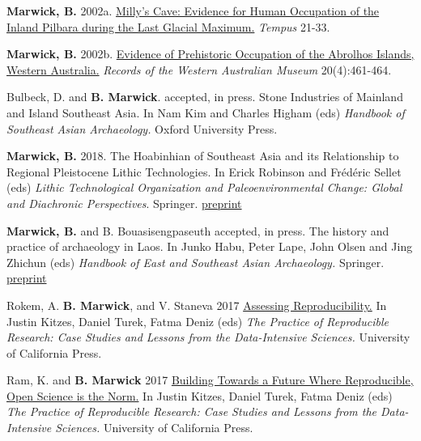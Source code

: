 \documentclass[11pt,article,oneside]{memoir}
\begin{document}
{{{{\ind \textbf{Marwick, B.} 2002a. \href{http://faculty.washington.edu/bmarwick/PDFs/Marwick_2002_Tempus.pdf}{Milly's Cave: Evidence for Human Occupation of the Inland Pilbara during the Last Glacial Maximum.} \textit{Tempus} 21-33.

\ind \textbf{Marwick, B.} 2002b. \href{http://faculty.washington.edu/bmarwick/PDFs/Marwick_2002_RWAM.pdf}{Evidence of Prehistoric Occupation of the Abrolhos Islands, Western Australia.} \textit{Records of the Western Australian Museum} 20(4):461-464.

\bigskip


\ind Bulbeck, D. and \textbf{B. Marwick}. accepted, in press. Stone Industries of Mainland and Island Southeast Asia. In Nam Kim and Charles Higham (eds) \textit{Handbook of Southeast Asian Archaeology.} Oxford University Press.

\ind \textbf{Marwick, B.} 2018. The Hoabinhian of Southeast Asia and its Relationship to Regional Pleistocene Lithic Technologies. In Erick Robinson and Frédéric Sellet (eds) \textit{Lithic Technological Organization and Paleoenvironmental Change: Global and Diachronic Perspectives}. Springer. \href{https://doi.org/10.17605/OSF.IO/9PT8G}{preprint}

\ind \textbf{Marwick, B.} and B. Bouasisengpaseuth accepted, in press. The history and practice of archaeology in Laos. In Junko Habu, Peter Lape, John Olsen  and Jing Zhichun (eds) \textit{ Handbook of East and Southeast Asian Archaeology.} Springer. \href{https://dx.doi.org/10.17605/OSF.IO/75ZHC}{preprint}

\ind Rokem, A. \textbf{B. Marwick}, and V. Staneva 2017 \href{https://www.practicereproducibleresearch.org/core-chapters/2-assessment.html}{Assessing Reproducibility.} In Justin Kitzes, Daniel Turek, Fatma Deniz (eds) \textit{The Practice of Reproducible Research: Case Studies and Lessons from the Data-Intensive Sciences.} University of California Press.

\ind Ram, K. and \textbf{B. Marwick} 2017 \href{https://www.practicereproducibleresearch.org/core-chapters/6-future.html}{Building Towards a Future Where Reproducible, Open Science is the Norm.} In Justin Kitzes, Daniel Turek, Fatma Deniz (eds) \textit{The Practice of Reproducible Research: Case Studies and Lessons from the Data-Intensive Sciences.} University of California Press.

}}}}
\end{document}
